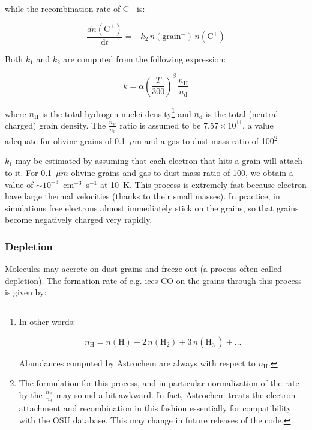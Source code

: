 \documentclass[a4paper,12pt]{article}
\newcommand{\conc}[1]{n(\mathrm{#1})}
\begin{document}
\noindent
while the recombination rate of $\mathrm{C^{+}}$ is:

\begin{equation}
  \frac{d \conc{C^{+}}}{\mathrm{d}t} = - k_{2} \, \conc{grain^{-}} \, \conc{C^{+}}
\end{equation}

Both $k_{1}$ and $k_{2}$ are computed from the following expression:

\begin{equation}
  k = \alpha \left( \frac{T}{300} \right)^\beta \, \frac{n_\mathrm{H}}{n_\mathrm{d}}
  \label{eq:grain-attach-neutralization}
\end{equation}

\noindent
where $n_\mathrm{H}$ is the total hydrogen nuclei density\footnote{In
  other words:

  \begin{equation}
    n_\mathrm{H} = \conc{H} + 2 \, \conc{H_{2}} + 3 \,
    \conc{H_{3}^{+}} + ...
  \end{equation}
  
  Abundances computed by Astrochem are always with respect to
  $n_\mathrm{H}$.}  and $n_\mathrm{d}$ is the total (neutral +
charged) grain density. The $\frac{n_\mathrm{H}}{n_\mathrm{d}}$ ratio
is assumed to be $7.57 \times 10^{11}$, a value adequate for olivine
grains of 0.1~$\mu$m and a gas-to-dust mass ratio of 100\footnote{The
  formulation for this process, and in particular normalization of the
  rate by the $\frac{n_\mathrm{H}}{n_\mathrm{d}}$ may sound a bit
  awkward. In fact, Astrochem treats the electron attachment and
  recombination in this fashion essentially for compatibility with the
  OSU database. This may change in future releases of the code.}

$k_{1}$ may be estimated by assuming that each electron that hits a
grain will attach to it. For 0.1~$\mu m$ olivine grains and
gas-to-dust mass ratio of 100, we obtain a value of $\sim
10^{-3}$~cm$^{-3}$~s$^{-1}$ at 10~K. This process is extremely fast
because electron have large thermal velocities (thanks to their small
masses). In practice, in simulations free electrons almost immediately
stick on the grains, so that grains become negatively charged very
rapidly.

\subsubsection{Depletion}
\label{sec:depletion}

Molecules may accrete on dust grains and freeze-out (a process often
called depletion). The formation rate of e.g. ices CO on the grains
through this process is given by:
\end{document}
